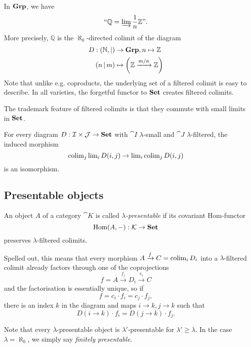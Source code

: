 \begin{Example}\label{ex:Q}
In $\mathbf{Grp}$, we have 
\[ \text{``}\mathbb Q = \varinjlim \frac 1 n \mathbb Z\text{''}. \]
More precisely, $\mathbb Q$ is the $\aleph_0$-directed colimit of the diagram
\begin{align*}
 D : (\mathbb N, |) &\to \mathbf{Grp}, n \mapsto \mathbb Z \\
 (n\, | \,m) &\mapsto \left(\mathbb Z \xrightarrow{m/n} \mathbb Z\right)
\end{align*}
Note that unlike e.g. coproducts, the underlying set of a filtered colimit is easy to describe. In all varieties, the forgetful functor to $\mathbf{Set}$ creates filtered colimits.
\end{Example}

The trademark feature of filtered colimits is that they commute with small limits in $\mathbf{Set}$.

\begin{Lemma}\label{prop:smallvsfiltered}
For every diagram $D : \mathcal{I} \times \mathcal{J} \to \mathbf{Set}$ with $\cat I$ $\lambda$-small and $\cat J$ $\lambda$-filtered, the induced morphism
\[ \operatorname{colim}_j \operatorname{lim}_i D(i,j) \to \operatorname{lim}_i \operatorname{colim}_j D(i,j) \]
is an isomorphism.
\end{Lemma}

\subsection{Presentable objects}
\begin{Definition}\label{def:presentableobject}
An object $A$ of a category $\cat K$ is called \emph{$\lambda$-presentable} if its covariant Hom-functor 
\[ \textrm{Hom}(A,-) : \mathcal{K} \to \mathbf{Set} \]
preserves $\lambda$-filtered colimits.
\end{Definition}
Spelled out, this means that every morphism $A \xrightarrow{f} C = \operatorname{colim}_i D_i$ into a $\lambda$-filtered colimit already factors through one of the coprojections
\[ f = A \xrightarrow{f_i} D_i \xrightarrow{c_i} C \]
and the factorisation is essentially unique, so if \[ f = c_i\cdot f_i = c_j \cdot f_j, \]
there is an index $k$ in the diagram and maps $i \to k, j \to k$ such that
\[ D(i \to k)\cdot f_i = D(j \to k) \cdot f_j. \]

Note that every $\lambda$-presentable object is $\lambda'$-presentable for $\lambda' \geq \lambda$. In the case $\lambda=\aleph_0$, we simply say \emph{finitely presentable}. \\

